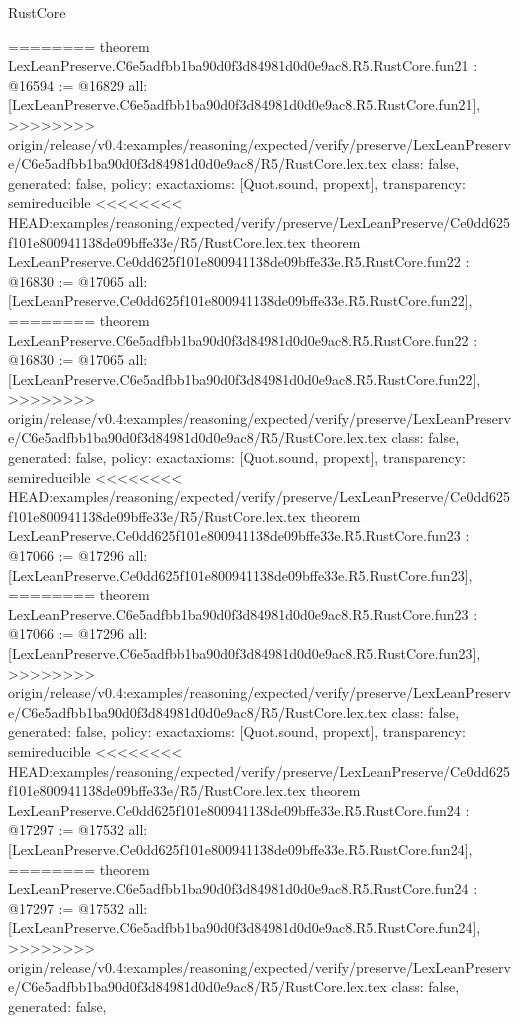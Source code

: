 \begin{lexlean}{RustCore}
\begin{coremodule}
{\begin{coremodule}
{{{{{{{{{{{{{{{{{{{{{{{{========
theorem LexLeanPreserve.C6e5adfbb1ba90d0f3d84981d0d0e9ac8.R5.RustCore.fun21 : @16594 := @16829 {
  all: [LexLeanPreserve.C6e5adfbb1ba90d0f3d84981d0d0e9ac8.R5.RustCore.fun21],
>>>>>>>> origin/release/v0.4:examples/reasoning/expected/verify/preserve/LexLeanPreserve/C6e5adfbb1ba90d0f3d84981d0d0e9ac8/R5/RustCore.lex.tex
  class: false,
  generated: false,
  policy: exact{axioms: [Quot.sound, propext]},
  transparency: semireducible
}
<<<<<<<< HEAD:examples/reasoning/expected/verify/preserve/LexLeanPreserve/Ce0dd625f101e800941138de09bffe33e/R5/RustCore.lex.tex
theorem LexLeanPreserve.Ce0dd625f101e800941138de09bffe33e.R5.RustCore.fun22 : @16830 := @17065 {
  all: [LexLeanPreserve.Ce0dd625f101e800941138de09bffe33e.R5.RustCore.fun22],
========
theorem LexLeanPreserve.C6e5adfbb1ba90d0f3d84981d0d0e9ac8.R5.RustCore.fun22 : @16830 := @17065 {
  all: [LexLeanPreserve.C6e5adfbb1ba90d0f3d84981d0d0e9ac8.R5.RustCore.fun22],
>>>>>>>> origin/release/v0.4:examples/reasoning/expected/verify/preserve/LexLeanPreserve/C6e5adfbb1ba90d0f3d84981d0d0e9ac8/R5/RustCore.lex.tex
  class: false,
  generated: false,
  policy: exact{axioms: [Quot.sound, propext]},
  transparency: semireducible
}
<<<<<<<< HEAD:examples/reasoning/expected/verify/preserve/LexLeanPreserve/Ce0dd625f101e800941138de09bffe33e/R5/RustCore.lex.tex
theorem LexLeanPreserve.Ce0dd625f101e800941138de09bffe33e.R5.RustCore.fun23 : @17066 := @17296 {
  all: [LexLeanPreserve.Ce0dd625f101e800941138de09bffe33e.R5.RustCore.fun23],
========
theorem LexLeanPreserve.C6e5adfbb1ba90d0f3d84981d0d0e9ac8.R5.RustCore.fun23 : @17066 := @17296 {
  all: [LexLeanPreserve.C6e5adfbb1ba90d0f3d84981d0d0e9ac8.R5.RustCore.fun23],
>>>>>>>> origin/release/v0.4:examples/reasoning/expected/verify/preserve/LexLeanPreserve/C6e5adfbb1ba90d0f3d84981d0d0e9ac8/R5/RustCore.lex.tex
  class: false,
  generated: false,
  policy: exact{axioms: [Quot.sound, propext]},
  transparency: semireducible
}
<<<<<<<< HEAD:examples/reasoning/expected/verify/preserve/LexLeanPreserve/Ce0dd625f101e800941138de09bffe33e/R5/RustCore.lex.tex
theorem LexLeanPreserve.Ce0dd625f101e800941138de09bffe33e.R5.RustCore.fun24 : @17297 := @17532 {
  all: [LexLeanPreserve.Ce0dd625f101e800941138de09bffe33e.R5.RustCore.fun24],
========
theorem LexLeanPreserve.C6e5adfbb1ba90d0f3d84981d0d0e9ac8.R5.RustCore.fun24 : @17297 := @17532 {
  all: [LexLeanPreserve.C6e5adfbb1ba90d0f3d84981d0d0e9ac8.R5.RustCore.fun24],
>>>>>>>> origin/release/v0.4:examples/reasoning/expected/verify/preserve/LexLeanPreserve/C6e5adfbb1ba90d0f3d84981d0d0e9ac8/R5/RustCore.lex.tex
  class: false,
  generated: false,
}}}}}}}}}}}}}}}}}}}}}}}}}}}}
\end{coremodule}}
\end{coremodule}
\end{lexlean}
